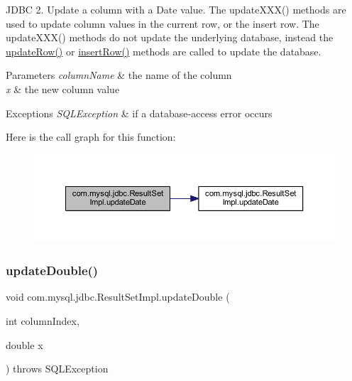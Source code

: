 J\+D\+BC 2. Update a column with a Date value. The update\+X\+X\+X() methods are used to update column values in the current row, or the insert row. The update\+X\+X\+X() methods do not update the underlying database, instead the \mbox{\hyperlink{classcom_1_1mysql_1_1jdbc_1_1_result_set_impl_a2842d32292d023aaeeafedeed3322981}{update\+Row()}} or \mbox{\hyperlink{classcom_1_1mysql_1_1jdbc_1_1_result_set_impl_a78e304e3279cbcf60392f18c1385e3bf}{insert\+Row()}} methods are called to update the database.


\begin{DoxyParams}{Parameters}
{\em column\+Name} & the name of the column \\
\hline
{\em x} & the new column value\\
\hline
\end{DoxyParams}

\begin{DoxyExceptions}{Exceptions}
{\em S\+Q\+L\+Exception} & if a database-\/access error occurs \\
\hline
\end{DoxyExceptions}
Here is the call graph for this function\+:
\nopagebreak
\begin{figure}[H]
\begin{center}
\leavevmode
\includegraphics[width=350pt]{classcom_1_1mysql_1_1jdbc_1_1_result_set_impl_a39ed44af35f25e15d4d5657663301cfb_cgraph}
\end{center}
\end{figure}
\mbox{\label{classcom_1_1mysql_1_1jdbc_1_1_result_set_impl_a96ad2b9447082dceb1828acb8377645e}} 
\subsubsection{\texorpdfstring{update\+Double()}{updateDouble()}\hspace{0.1cm}{\footnotesize\ttfamily [1/2]}}
{\footnotesize\ttfamily void com.\+mysql.\+jdbc.\+Result\+Set\+Impl.\+update\+Double (\begin{DoxyParamCaption}\item[{int}]{column\+Index,  }\item[{double}]{x }\end{DoxyParamCaption}) throws S\+Q\+L\+Exception}


